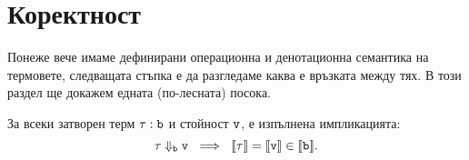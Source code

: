 \section{Коректност}

Понеже вече имаме дефинирани операционна и денотационна семантика на термовете,
следващата стъпка е да разгледаме каква е връзката между тях.
В този раздел ще докажем едната (по-лесната) посока.

\begin{framed}
  \begin{theorem}\label{th:pcf:soundness}
    За всеки затворен терм $\tau : \texttt{b}$ и стойност $\texttt{v}$, е изпълнена импликацията:
    \[\tau \Downarrow_{\texttt{b}} \texttt{v}\ \implies\ \llbracket{\tau}\rrbracket = \llbracket{\texttt{v}}\rrbracket \in \llbracket{\texttt{b}}\rrbracket.\]
  \end{theorem}  
\end{framed}
